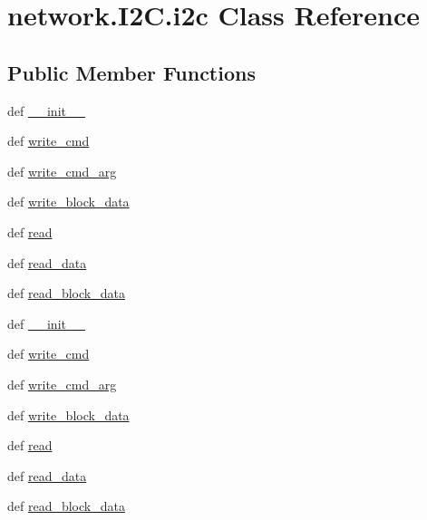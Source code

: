 \hypertarget{classnetwork_1_1I2C_1_1i2c}{}\section{network.\+I2\+C.\+i2c Class Reference}
\label{classnetwork_1_1I2C_1_1i2c}
\subsection*{Public Member Functions}
\begin{DoxyCompactItemize}
\item 
def \hyperlink{classnetwork_1_1I2C_1_1i2c_a4c67f9c04de709214b672c552e1216dd}{\+\_\+\+\_\+init\+\_\+\+\_\+}
\item 
def \hyperlink{classnetwork_1_1I2C_1_1i2c_a88e5789401d5b33a462412c38f5b1c2c}{write\+\_\+cmd}
\item 
def \hyperlink{classnetwork_1_1I2C_1_1i2c_a5254eef4f67541372a8e0e70bd846593}{write\+\_\+cmd\+\_\+arg}
\item 
def \hyperlink{classnetwork_1_1I2C_1_1i2c_ae2eb38185381cb2307b3f3ca5cd819af}{write\+\_\+block\+\_\+data}
\item 
def \hyperlink{classnetwork_1_1I2C_1_1i2c_a92d95fdee4c3dce774e083f566436c84}{read}
\item 
def \hyperlink{classnetwork_1_1I2C_1_1i2c_a57e1f004ef70ea82c9410392662e7412}{read\+\_\+data}
\item 
def \hyperlink{classnetwork_1_1I2C_1_1i2c_a105b6381dad9576d206794d99ac31d6d}{read\+\_\+block\+\_\+data}
\item 
def \hyperlink{classnetwork_1_1I2C_1_1i2c_a4c67f9c04de709214b672c552e1216dd}{\+\_\+\+\_\+init\+\_\+\+\_\+}
\item 
def \hyperlink{classnetwork_1_1I2C_1_1i2c_a88e5789401d5b33a462412c38f5b1c2c}{write\+\_\+cmd}
\item 
def \hyperlink{classnetwork_1_1I2C_1_1i2c_a5254eef4f67541372a8e0e70bd846593}{write\+\_\+cmd\+\_\+arg}
\item 
def \hyperlink{classnetwork_1_1I2C_1_1i2c_ae2eb38185381cb2307b3f3ca5cd819af}{write\+\_\+block\+\_\+data}
\item 
def \hyperlink{classnetwork_1_1I2C_1_1i2c_a92d95fdee4c3dce774e083f566436c84}{read}
\item 
def \hyperlink{classnetwork_1_1I2C_1_1i2c_a57e1f004ef70ea82c9410392662e7412}{read\+\_\+data}
\item 
def \hyperlink{classnetwork_1_1I2C_1_1i2c_a105b6381dad9576d206794d99ac31d6d}{read\+\_\+block\+\_\+data}
\end{DoxyCompactItemize}
